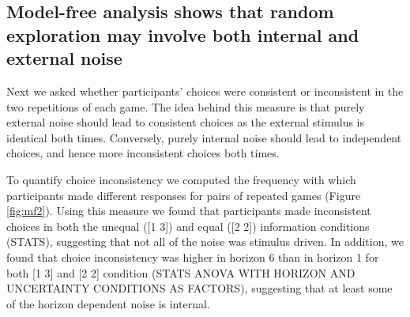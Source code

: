 \documentclass[12pt]{article}
\begin{document}
	\subsection*{Model-free analysis shows that random exploration may involve both internal and external noise}
	
	
	Next we asked whether participants' choices were consistent or inconsistent in the two repetitions of each game.  The idea behind this measure is that purely external noise should lead to consistent choices as the external stimulus is identical both times. Conversely, purely internal noise should lead to independent choices, and hence more inconsistent choices both times. 
	
	To quantify choice inconsistency we computed the frequency with which participants made different responses for pairs of repeated games (Figure \ref{fig:mf2}). Using this measure we found that participants made inconsistent choices in both the unequal ([1 3]) and equal ([2 2]) information conditions (STATS), suggesting that not all of the noise was stimulus driven. In addition, we found that choice inconsistency was higher in horizon 6 than in horizon 1 for both [1 3] and [2 2] condition (STATS ANOVA WITH HORIZON AND UNCERTAINTY CONDITIONS AS FACTORS), suggesting that at least some of the horizon dependent noise is internal.
	
	
	
	
\end{document}
